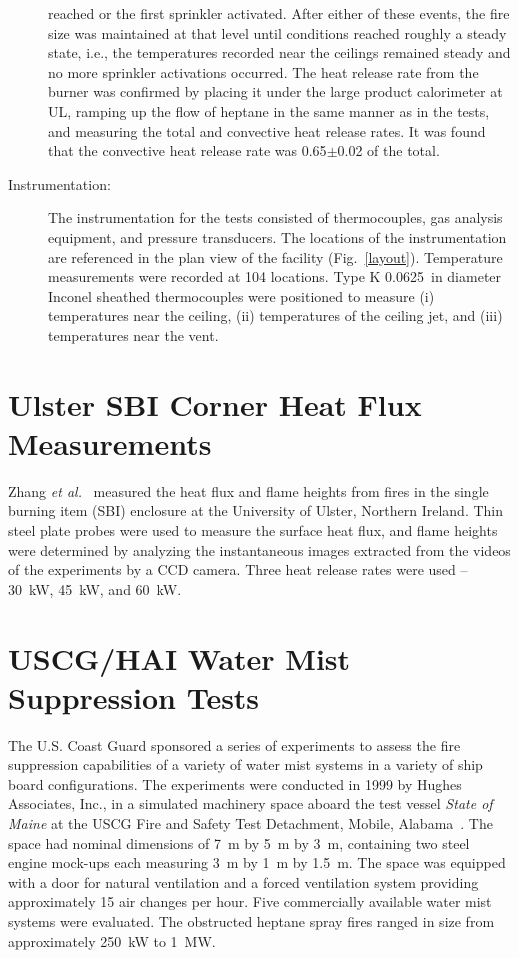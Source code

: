 \begin{description}
reached or the first sprinkler activated. After either of these events, the fire size was maintained at that level until conditions reached roughly a
steady state, i.e., the temperatures recorded near the ceilings remained steady and no more sprinkler activations occurred.
The heat release rate from the burner was confirmed by placing it under the large product calorimeter at UL, ramping up the flow of heptane in the
same manner as in the tests, and measuring the total and convective heat release rates. It was found that the convective heat release rate was
0.65$\pm$0.02 of the total.
\item[Instrumentation:] The instrumentation for the tests consisted of thermocouples, gas analysis equipment, and pressure transducers. The locations of the instrumentation
are referenced in the plan view of the facility (Fig.~\ref{layout}).
Temperature measurements were recorded at 104 locations. Type K 0.0625~in diameter Inconel sheathed thermocouples were positioned to measure (i)
temperatures near the ceiling, (ii) temperatures of the ceiling jet, and (iii) temperatures near the vent.
\end{description}


\clearpage


\section{Ulster SBI Corner Heat Flux Measurements}

Zhang {\em et al.}~\cite{Zhang:IAFSS9} measured the heat flux and flame heights from
fires in the single burning item (SBI) enclosure at the University of Ulster, Northern Ireland.
Thin steel plate probes were used to measure the surface heat flux, and flame
heights were determined by analyzing the instantaneous images extracted from the videos of the
experiments by a CCD camera. Three heat release rates were used -- 30~kW, 45~kW, and 60~kW.



\section{USCG/HAI Water Mist Suppression Tests}

The U.S. Coast Guard sponsored a series of experiments to assess the fire suppression capabilities of a variety of water mist systems in a variety of ship board configurations. The
experiments were conducted in 1999 by Hughes Associates, Inc., in a simulated machinery space aboard the test vessel {\em State of Maine} at the USCG Fire and Safety Test Detachment,
Mobile, Alabama~\cite{Back:USCG1999}.
The space had nominal dimensions of 7~m by 5~m by 3~m, containing two steel engine mock-ups each measuring 3~m by 1~m by 1.5~m. The space was equipped with a door
for natural ventilation and a forced ventilation system providing approximately 15 air changes per hour. Five commercially available water mist systems were evaluated. The
obstructed heptane spray fires ranged in size from approximately 250~kW to 1~MW.



